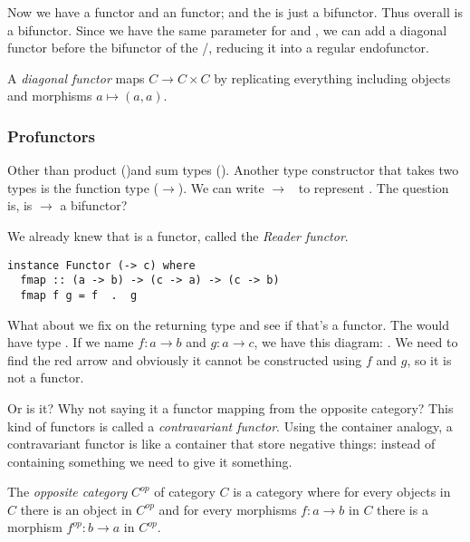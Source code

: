 Now we have a  functor and an  functor; and the
 is just a bifunctor. Thus overall  is a bifunctor.
Since we have the same parameter  for  and
, we can add a diagonal functor before the bifunctor of the
/, reducing it into a regular endofunctor.

\hfill
\begin{remark}
  A \emph{diagonal functor} maps $C \to C \times C$ by replicating everything
  including objects and morphisms $a \mapsto (a, a)$.
\end{remark}

\subsubsection{Profunctors}

Other than product (\code{()})and sum types (). Another type
constructor that takes two types is the function type ($\to$). We can write
\code{(}$\to$\code{)}~ to represent . The question is, is
$\to$ a bifunctor?

We already knew that  is a functor, called the \emph{Reader
  functor}.

\begin{lstlisting}
instance Functor (-> c) where
  fmap :: (a -> b) -> (c -> a) -> (c -> b)
  fmap f g = f  .  g
\end{lstlisting}

What about we fix on the returning type and see if that's a functor. The
 would have type .
If we name $f: a\to b$ and $g: a \to c$, we have this diagram: . We need to find the red arrow and
obviously it cannot be constructed using $f$ and $g$, so it is not a functor.

Or is it? Why not saying it a functor mapping from the opposite category? This
kind of functors is called a \emph{contravariant functor}. Using the container
analogy, a contravariant functor is like a container that store negative things:
instead of containing something we need to give it something.

\hfill
\begin{remark}
  The \emph{opposite category} $C^{op}$ of category $C$ is a category where for
  every objects in $C$ there is an object in $C^{op}$ and for every morphisms $f
  : a\to b$ in $C$ there is a morphism $f^{op} : b \to a$ in $C^{op}$.
\end{remark}


